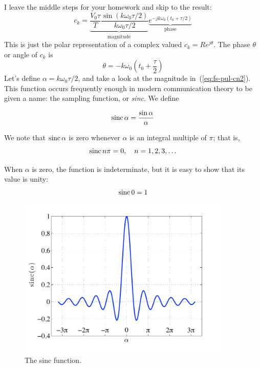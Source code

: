 I leave the middle steps for your homework and skip to the result:
\begin{equation}
c_k=
  \underbrace{\frac{V_0\tau}{T}
     \frac{\sin(k\omega_0\tau/2)}{k\omega_0\tau/2}}_{\mathrm{magnitude}}
  \underbrace{e^{-jk\omega_0(t_0+\tau/2)}}_{\mathrm{phase}}
\label{eq:fs-pul-cn2}
\end{equation}
This is just the polar representation of a complex valued $c_k = R
e^{j\theta}$.  The phase $\theta$ or angle of $c_k$ is
\begin{equation}
\theta=-k\omega_0 \left(t_0+\frac{\tau}{2}\right)
\end{equation}
Let's define $\alpha=k\omega_0 \tau/2$, and take a look at the
magnitude in~(\ref{eq:fs-pul-cn2}). This function occurs frequently
enough in modern communication theory to be given a name: the sampling
function, or \emph{sinc}. We define

\begin{equation}
\operatorname{sinc}\alpha = \frac{\sin\alpha}{\alpha}
\end{equation}

We note that $\operatorname{sinc}\alpha$ is zero whenever $\alpha$ is an integral
multiple of $\pi$; that is,
\begin{equation}
\operatorname{sinc} n\pi = 0, \quad n=1, 2, 3, \ldots
\label{eq:fs-Snpi}
\end{equation}

When $\alpha$ is zero, the function is indeterminate, but it is easy
to show that its value is unity: 
\begin{equation}
\operatorname{sinc} 0 = 1
\label{eq:fs-S0}
\end{equation}

\begin{figure}
\centerline{\includegraphics[height=3in]{ch-physical/fs_sinc}}
\caption{The sinc function.\label{fig:sinc}}
\end{figure}

